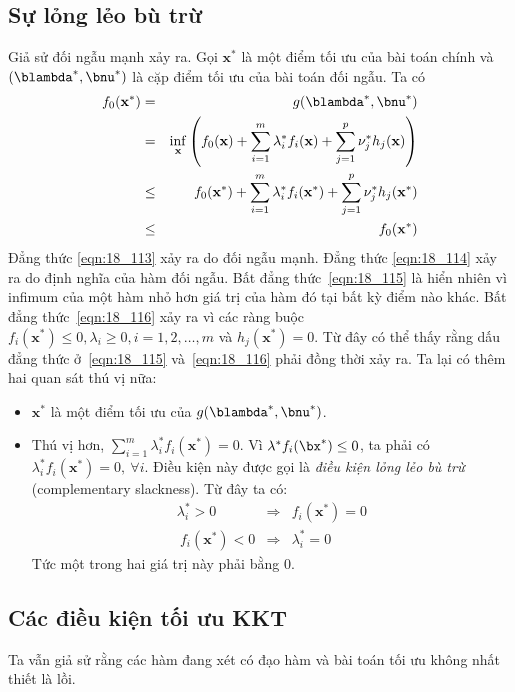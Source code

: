 \subsection{Sự lỏng lẻo bù trừ}
Giả sử đối ngẫu mạnh xảy ra. Gọi $\mathbf{x}^*$ là một điểm
tối ưu của bài toán chính và $(\blambda^*, \bnu^*)$ là cặp điểm tối ưu của bài toán đối ngẫu. Ta có
\begin{eqnarray} 
\label{eqn:18_113}
    f_0(\mathbf{x}^*) &=& g(\blambda^*,\bnu^*) \\
\label{eqn:18_114}
    &=& \inf_{\mathbf{x}} \left(f_0(\mathbf{x}) + \sum_{i=1}^m \lambda_i^* f_i(\mathbf{x}) + \sum_{j=1}^p \nu_j^* h_j(\mathbf{x})\right)\\
\label{eqn:18_115}
    &\leq& f_0(\mathbf{x}^*) + \sum_{i=1}^m \lambda_i^* f_i(\mathbf{x}^*) + \sum_{j=1}^p \nu_j^* h_j(\mathbf{x}^*) \\
\label{eqn:18_116}
    &\leq& f_0(\mathbf{x}^*) 
\end{eqnarray} 
Đẳng thức \eqref{eqn:18_113} xảy ra do đối ngẫu mạnh. Đẳng thức
\eqref{eqn:18_114} xảy ra do định nghĩa của hàm đối ngẫu. Bất đẳng
thức~\eqref{eqn:18_115} là hiển nhiên vì infimum của một hàm nhỏ hơn giá trị của
hàm đó tại bất kỳ điểm nào khác. Bất đẳng thức~\eqref{eqn:18_116} xảy ra vì
các ràng buộc $f_i(\mathbf{x}^*) \leq 0, \lambda_i \geq 0, i = 1, 2, \dots, m$
và $h_j(\mathbf{x}^*) = 0$. Từ đây có thể thấy rằng dấu đẳng thức
ở~\eqref{eqn:18_115} và~\eqref{eqn:18_116} phải đồng thời xảy ra. Ta lại có
thêm hai quan sát thú vị nữa:
\begin{itemize}
    \item $\mathbf{x}^*$ là một điểm tối ưu của $g(\blambda^*, \bnu^*)$. 
     
    \item Thú vị hơn, $\displaystyle \sum_{i=1}^m \lambda_i^* f_i(\mathbf{x}^*)
    = 0$. Vì $\lambda^*f_i(\bx^*) \leq 0$, ta phải có 
    $\lambda_i^*f_i(\mathbf{x}^*) = 0,~\forall i$.
Điều kiện này được gọi là \textit{điều kiện lỏng lẻo bù trừ} (complementary slackness). Từ đây ta có:
\begin{eqnarray} 
\lambda_i^* > 0 &\Rightarrow& f_i(\mathbf{x}^*) = 0 \\\ 
f_i(\mathbf{x}^*) < 0 &\Rightarrow& \lambda_i^* = 0  
\end{eqnarray} 
Tức một trong hai giá trị này phải bằng 0.  
\end{itemize}
 
\subsection{Các điều kiện tối ưu KKT}
\label{ssec:kkt}
Ta vẫn giả sử rằng các hàm đang xét có đạo hàm và bài toán tối ưu không nhất
thiết là lồi.  
 
